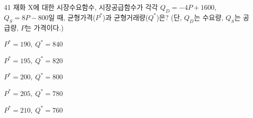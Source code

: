 \begin{question}{41}
재화 X에 대한 시장수요함수, 시장공급함수가 각각 $Q_{D}=-4P+1600$,
$Q_{S}=8P-800$일 때, 균형가격($P^{*}$)과 균형거래량($Q^{*}$)은? (단, $Q_{D}$는 수요량, $Q_{S}$는 공급량, $P$는 가격이다.) \par
\begin{choices}
  \item $P^{*}=190,\ Q^{*}=840$
  \item $P^{*}=195,\ Q^{*}=820$
  \item $P^{*}=200,\ Q^{*}=800$
  \item $P^{*}=205,\ Q^{*}=780$
  \item $P^{*}=210,\ Q^{*}=760$
\end{choices}
\end{question}
